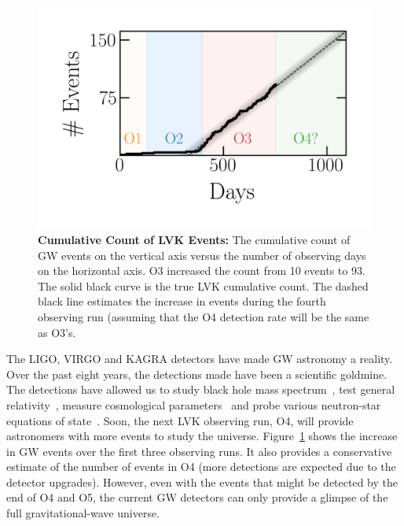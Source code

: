 \begin{figure}
\begin{center}
\centerline{\includegraphics[width=1.\linewidth]{src/figures/gw_detection_timeframe.png}}
  \caption{\textbf{Cumulative Count of LVK Events:} The cumulative count of GW events on the vertical axis versus the number of observing days on the horizontal axis. O3 increased the count from 10 events to 93. The solid black curve is the true LVK cumulative count. The dashed black line estimates the increase in events during the fourth observing run (assuming that the O4 detection rate will be the same as O3's.  }
  \label{fig:accumulation_of_gw_events}
\end{center}
\end{figure}

The LIGO, VIRGO and KAGRA detectors have made GW astronomy a reality. 
Over the past eight years, the detections made have been a scientific goldmine. 
The detections have allowed us to study black hole mass spectrum~\cite{gwtc3_pop_inf}, test general relativity~\cite{gr_tests_gwtc3}, measure cosmological parameters~\cite{Abbott:2017:Natur, multimessenger_gw_h0, 190521_H0, Mukherjee:2022:arXiv} and probe various neutron-star equations of state~\cite{Annala:2018:PhRvL}. 
Soon, the next LVK observing run, O4, will provide astronomers with more events to study the universe. 
Figure~\ref{fig:accumulation_of_gw_events} shows the increase in GW events over the first three observing runs. 
It also provides a conservative estimate of the number of events in O4 (more detections are expected due to the detector upgrades).
However, even with the events that might be detected by the end of O4 and O5, the current GW detectors can only provide a glimpse of the full gravitational-wave universe. 

